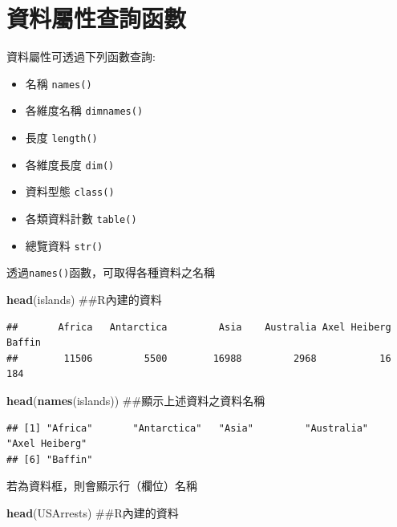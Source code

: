 \documentclass[]{book}
\newenvironment{Shaded}{\begin{snugshade}}{\end{snugshade}}
\newcommand{\KeywordTok}[1]{\textcolor[rgb]{0.13,0.29,0.53}{\textbf{{#1}}}}
\newcommand{\NormalTok}[1]{{#1}}
\providecommand{\tightlist}{%
  \setlength{\itemsep}{0pt}\setlength{\parskip}{0pt}}
\theoremstyle{definition}
\theoremstyle{definition}
\theoremstyle{remark}
\begin{document}
\section{資料屬性查詢函數}

資料屬性可透過下列函數查詢:

\begin{itemize}
\tightlist
\item
  名稱 \texttt{names()}
\item
  各維度名稱 \texttt{dimnames()}
\item
  長度 \texttt{length()}
\item
  各維度長度 \texttt{dim()}
\item
  資料型態 \texttt{class()}
\item
  各類資料計數 \texttt{table()}
\item
  總覽資料 \texttt{str()}
\end{itemize}

透過\texttt{names()}函數，可取得各種資料之名稱

\begin{Shaded}
\begin{Highlighting}[]
\KeywordTok{head}\NormalTok{(islands) ##R內建的資料}
\end{Highlighting}
\end{Shaded}

\begin{verbatim}
##       Africa   Antarctica         Asia    Australia Axel Heiberg       Baffin 
##        11506         5500        16988         2968           16          184
\end{verbatim}

\begin{Shaded}
\begin{Highlighting}[]
\KeywordTok{head}\NormalTok{(}\KeywordTok{names}\NormalTok{(islands)) ##顯示上述資料之資料名稱}
\end{Highlighting}
\end{Shaded}

\begin{verbatim}
## [1] "Africa"       "Antarctica"   "Asia"         "Australia"    "Axel Heiberg"
## [6] "Baffin"
\end{verbatim}

若為資料框，則會顯示行（欄位）名稱

\begin{Shaded}
\begin{Highlighting}[]
\KeywordTok{head}\NormalTok{(USArrests) ##R內建的資料}
\end{Highlighting}
\end{Shaded}
\end{document}
